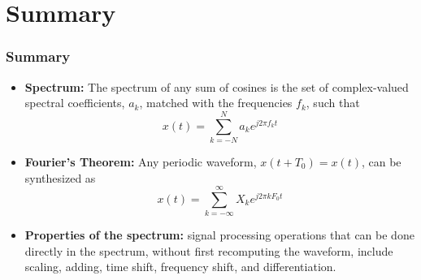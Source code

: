 \documentclass{beamer}
\begin{document}
\section[Summary]{Summary}
\setcounter{subsection}{1}

\begin{frame}
  \frametitle{Summary}
  \begin{itemize}
  \item {\bf Spectrum:} The spectrum of any sum of cosines is the set
    of complex-valued spectral coefficients, $a_k$, matched with the
    frequencies $f_k$, such that
    \[
    x(t) = \sum_{k=-N}^N a_ke^{j2\pi f_kt}
    \]
  \item {\bf Fourier's Theorem:} Any periodic waveform,
    $x(t+T_0)=x(t)$, can be synthesized as
    \[
    x(t) = \sum_{k=-\infty}^\infty X_ke^{j2\pi kF_0t}
    \]
  \item {\bf Properties of the spectrum:} signal processing operations
    that can be done directly in the spectrum, without first
    recomputing the waveform, include scaling, adding, time shift,
    frequency shift, and differentiation.
  \end{itemize}
  
\end{frame}
\end{document}
